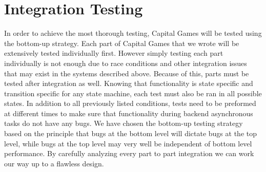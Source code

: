 \section{Integration Testing}

In order to achieve the most thorough testing, Capital Games will be 
tested using the bottom-up strategy. Each part of Capital Games that 
we wrote will be extensively tested individually first. However 
simply testing each part individually is not enough due to race 
conditions and other integration issues that may exist in the 
systems described above. Because of this, parts must be tested after 
integration as well.  Knowing that functionality is state specific 
and transition specific for any state machine, each test must also be 
ran in all possible states. In addition to all previously listed 
conditions, tests need to be preformed at different times to make sure 
that functionality during backend asynchronous tasks do not have any 
bugs. We have chosen the bottom-up testing strategy based on the 
principle that bugs at the bottom level will dictate bugs at the 
top level, while bugs at the top level may very well be independent 
of bottom level performance. By carefully analyzing every part to part 
integration we can work our way up to a flawless design.